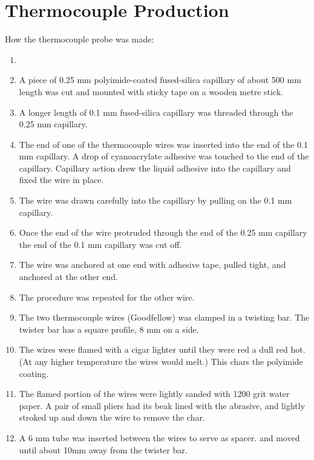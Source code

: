
\chapter{Thermocouple Production} %

\label{AppendixC} %

How the thermocouple probe was made:

\begin{enumerate}
  \item 
	\item A piece of 0.25 mm polyimide-coated fused-silica capillary of about 500 mm length was cut and mounted with sticky tape on a wooden metre stick.
	\item A longer length of 0.1 mm fused-silica capillary was threaded through the 0.25 mm capillary.
	\item The end of one of the thermocouple wires was inserted into the end of the 0.1 mm capillary. A drop of cyanoacrylate adhesive was touched to the end of the capillary. Capillary action drew the liquid adhesive into the capillary and fixed the wire in place.
	\item The wire was drawn carefully into the capillary by pulling on the 0.1 mm capillary.
	\item Once the end of the wire protruded through the end of the 0.25 mm capillary the end of the 0.1 mm capillary was cut off.
	\item The wire was anchored at one end with adhesive tape, pulled tight, and anchored at the other end. 
	\item The procedure was repeated for the other wire.
	\item The two thermocouple wires (Goodfellow) was clamped in a twisting bar. The twister bar has a square profile, 8 mm on a side.
	\item The wires were flamed with a cigar lighter until they were red a dull red hot. (At any higher temperature the wires would melt.) This chars the polyimide coating.
	\item The flamed portion of the wires were lightly sanded with 1200 grit water paper. A pair of small pliers had its beak lined with the abrasive, and lightly stroked up and down the wire to remove the char.
	\item A 6 mm tube was inserted between the wires to serve as spacer. and moved until about 10mm away from the twister bar.

\end{enumerate}
